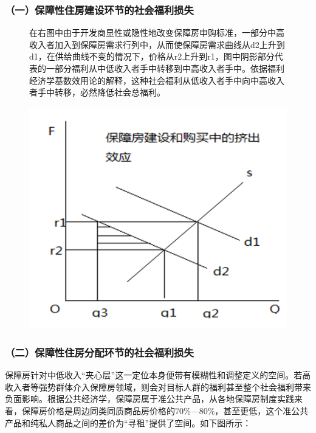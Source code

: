 \documentclass[aspectratio=169, 12pt]{beamer}
\begin{document}
\begin{frame}[plain]
    \frametitle{（一）保障性住房建设环节的社会福利损失}
    \begin{figure}
        \centering
        \begin{minipage}{0.4\linewidth}
            在右图中由于开发商显性或隐性地改变保障房申购标准，一部分中高收入者加入到保障房需求行列中，从而使保障房需求曲线从d2上升到d1，在供给曲线不变的情况下，价格从r2上升到r1，图中阴影部分代表的一部分福利从中低收入者手中转移到中高收入者手中。依据福利经济学基数效用论的解释，这种社会福利从低收入者手中向中高收入者手中转移，必然降低社会总福利。
        \end{minipage}%
        \begin{minipage}{0.6\linewidth}
            \centering
            \includegraphics[width=1.0\textwidth]{./resources/figure/squeeze.png}
        \end{minipage}
        \end{figure}
\end{frame}

\begin{frame}[plain]
    \frametitle{（二）保障性住房分配环节的社会福利损失}
    保障房针对中低收入“夹心层”这一定位本身便带有模糊性和调整定义的空间。若高收入者等强势群体介入保障房领域，则会对目标人群的福利甚至整个社会福利带来负面影响。根据公共经济学，保障房属于准公共产品，从各地保障房制度实践来看，保障房价格是周边同类同质商品房价格的70\%---80\%，甚至更低，这个准公共产品和纯私人商品之间的差价为“寻租”提供了空间。如下图所示：
\end{frame}
\end{document}
